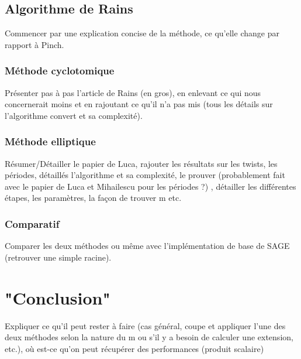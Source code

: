 \documentclass[a4paper]{article} %
\numberwithin{equation}{section}
\begin{document}
\subsection{Algorithme de Rains}
Commencer par une explication concise de la méthode, ce qu'elle change par 
rapport à Pinch.
\subsubsection{Méthode cyclotomique}
Présenter pas à pas l'article de Rains (en gros), en enlevant ce qui nous 
concernerait moins et en rajoutant ce qu'il n'a pas mis (tous les détails 
sur l'algorithme convert et sa complexité).
\subsubsection{Méthode elliptique}
Résumer/Détailler le papier de Luca, rajouter les résultats sur les twists, 
les périodes, détaillés l'algorithme et sa complexité, le prouver 
(probablement fait avec le papier de Luca et Mihailescu pour les périodes ?)
, détailler les différentes étapes, les paramètres, la façon de trouver m 
etc.
\subsubsection{Comparatif}
Comparer les deux méthodes ou même avec l'implémentation de base de SAGE 
(retrouver une simple racine).
\section{"Conclusion"}
Expliquer ce qu'il peut rester à faire (cas général, coupe et appliquer 
l'une des deux méthodes selon la nature du m ou s'il y a besoin de calculer 
une extension, etc.), où est-ce qu'on peut récupérer des performances 
(produit scalaire)
\end{document}

